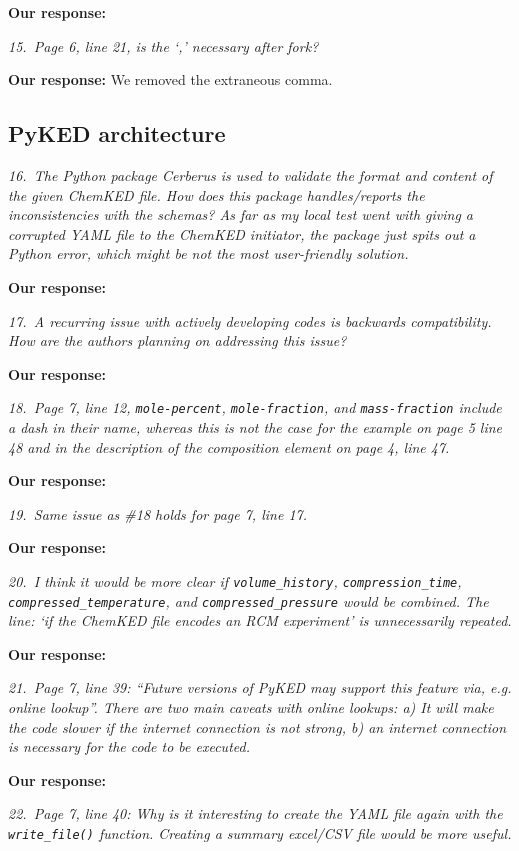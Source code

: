 \documentclass[a4paper,10pt]{elsarticle}
\begin{document}
\textbf{Our response:}


\textit{15.~Page 6, line 21, is the `,' necessary after fork?}

\textbf{Our response:}
We removed the extraneous comma.


\subsection*{PyKED architecture}

\textit{16.~The Python package Cerberus is used to validate the format and content of the given ChemKED file. How does this package handles/reports the inconsistencies with the schemas? As far as my local test went with giving a corrupted YAML file to the ChemKED initiator, the package just spits out a Python error, which might be not the most user-friendly solution.}

\textbf{Our response:}


\textit{17.~A recurring issue with actively developing codes is backwards compatibility. How are the authors planning on addressing this issue?}

\textbf{Our response:}


\textit{18.~Page 7, line 12, \texttt{mole-percent}, \texttt{mole-fraction}, and \texttt{mass-fraction} include a dash in their name, whereas this is not the case for the example on page 5 line 48 and in the description of the composition element on page 4, line 47.}

\textbf{Our response:}


\textit{19.~Same issue as \#18 holds for page 7, line 17.}

\textbf{Our response:}


\textit{20.~I think it would be more clear if \texttt{volume\_history}, \texttt{compression\_time}, \texttt{compressed\_temperature},
and \texttt{compressed\_pressure} would be combined. The line: `if the ChemKED file encodes an
RCM experiment' is unnecessarily repeated.}

\textbf{Our response:}


\textit{21.~Page 7, line 39: ``Future versions of PyKED may support this feature via, e.g. online lookup''.
There are two main caveats with online lookups: a) It will make the code slower if the internet
connection is not strong, b) an internet connection is necessary for the code to be executed.}

\textbf{Our response:}


\textit{22.~Page 7, line 40: Why is it interesting to create the YAML file again with the \texttt{write\_file()} function.
Creating a summary excel/CSV file would be more useful.}
\end{document}
